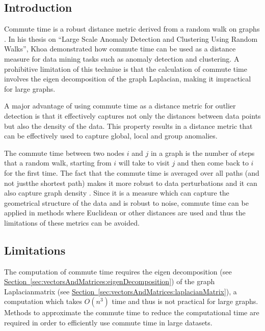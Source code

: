 \subsection{Introduction}
\label{sec:commuteTime:introduction}
Commute time is a robust distance metric derived from a random walk on graphs 
\cite{KHOA12}. In his thesis on ``Large Scale Anomaly Detection and Clustering 
Using Random Walks'', Khoa demonstrated how commute time can be used as a 
distance measure for data mining tasks such as anomaly detection and clustering.
A prohibitive limitation of this techniue is that the calculation of commute 
time involves the eigen decomposition of the graph Laplacian, making it 
impractical for large graphs.

A major advantage of using commute time as a distance metric for outlier 
detection is that it effectively captures not only the distances between data 
points but also the density of the data. This property results in a distance 
metric that can be effectively used to capture global, local and group 
anomalies.

The commute time between two nodes $i$ and $j$ in a graph is the number of steps
that a random walk, starting from $i$ will take to visit $j$ and then come back 
to $i$ for the first time. The fact that the commute time is averaged over all 
paths (and not justthe shortest path) makes it more robust to data perturbations
and it can also capture graph density \cite{KHOA12}. Since it is a measure which
can capture the geometrical structure of the data and is robust to noise, 
commute time can be applied in methods where Euclidean or other distances are 
used and thus the limitations of these metrics can be avoided.

\subsection{Limitations}
\label{sec:commuteTime:limitations}
The computation of commute time requires the eigen decomposition (see 
\hyperref[sec:vectorsAndMatrices:eigenDecomposition]
{Section~\ref{sec:vectorsAndMatrices:eigenDecomposition}}) of the graph 
Laplacianmatrix (see \hyperref[sec:vectorsAndMatrices:laplacianMatrix]
{Section~\ref{sec:vectorsAndMatrices:laplacianMatrix}}), a computation which 
takes $O(n^{3})$ time and thus is not practical for large graphs. Methods to 
approximate the commute time to reduce the computational time are required in 
order to efficiently use commute time in large datasets.

